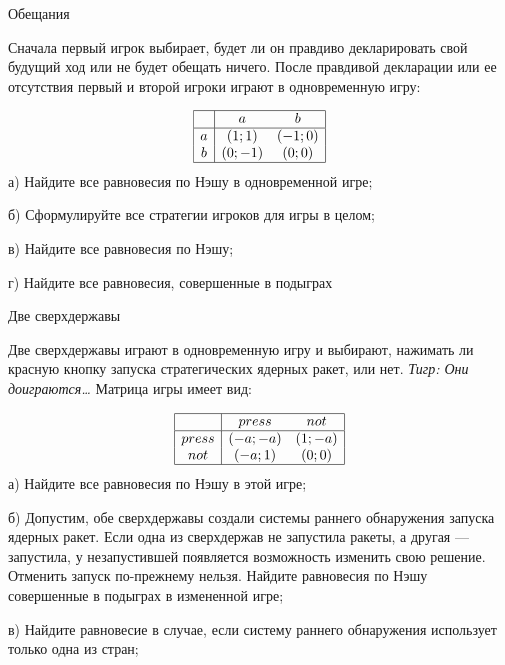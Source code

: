 \begin{problem}
 Обещания\par
Сначала первый игрок выбирает, будет ли он правдиво декларировать свой будущий ход или не будет обещать ничего. После правдивой декларации или ее отсутствия первый и второй игроки играют в одновременную игру:\par
\[\begin{array}{|c|cc|}  \hline {} & {a} & {b} \\  \hline {a} & {\left(1;1\right)} & {\left(-1;0\right)} \\ {b} & {\left(0;-1\right)} & {\left(0;0\right)} \\  \hline  \end{array}\]
а) Найдите все равновесия по Нэшу в одновременной игре;\par
б) Сформулируйте все стратегии игроков для игры в целом;\par
в) Найдите все равновесия по Нэшу;\par
г) Найдите все равновесия, совершенные в подыграх\par



\begin{sol}

\end{sol}
\end{problem}



\begin{problem}
 Две сверхдержавы\par
Две сверхдержавы играют в одновременную игру и выбирают, нажимать ли красную кнопку запуска стратегических ядерных ракет, или нет. {\it Тигр: Они доиграются\ldots } Матрица игры имеет вид:\par
\[\begin{array}{|c|cc|}  \hline {} & {press} & {not} \\  \hline {press} & {\left(-a;-a\right)} & {\left(1;-a\right)} \\ {not} & {\left(-a;1\right)} & {\left(0;0\right)} \\  \hline  \end{array}\]
а) Найдите все равновесия по Нэшу в этой игре;\par
б) Допустим, обе сверхдержавы создали системы раннего обнаружения запуска ядерных ракет. Если одна из сверхдержав не запустила ракеты, а другая — запустила, у незапустившей появляется возможность изменить свою решение. Отменить запуск по-прежнему нельзя. Найдите равновесия по Нэшу совершенные в подыграх в измененной игре;\par
в) Найдите равновесие в случае, если систему раннего обнаружения использует только одна из стран;\par



\begin{sol}

\end{sol}
\end{problem}




